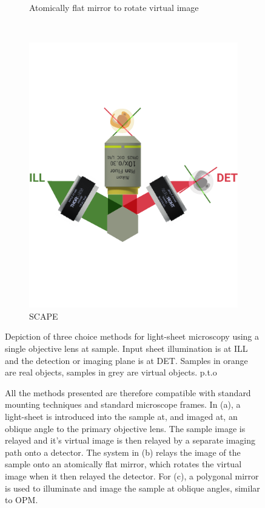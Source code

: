 \begin{figure}
\begin{subfigure}[t]{0.475\textwidth}
    \caption{Atomically flat mirror to rotate virtual image~\cite{li_axial_2014}}\label{fig:single_objectives/atomic_mirror}
  \end{subfigure}~
  \begin{subfigure}[t]{0.48\textwidth}
    \centering
    \includegraphics{single_objectives/scape}
    \caption{\gls{SCAPE}~\cite{bouchardSweptConfocallyalignedPlanar2015}}\label{fig:single_objectives/scape}
  \end{subfigure}
  \caption{Depiction of three choice methods for light-sheet microscopy using a single objective lens at sample.
  Input sheet illumination is at ILL and the detection or imaging plane is at DET.
  Samples in orange are real objects, samples in grey are virtual objects.
  p.t.o}
  \end{figure}
  \begin{figure}
    \ContinuedFloat
  \caption{
  All the methods presented are therefore compatible with standard mounting techniques and standard microscope frames.
  In (a), a light-sheet is introduced into the sample at, and imaged at, an oblique angle to the primary objective lens.
  The sample image is relayed and it's virtual image is then relayed by a separate imaging path onto a detector.
  The system in (b) relays the image of the sample onto an atomically flat mirror, which rotates the virtual image when it then relayed the detector.
  For (c), a polygonal mirror is used to illuminate and image the sample at oblique angles, similar to \gls{OPM}.}\label{fig:single_objectives}
\end{figure}

